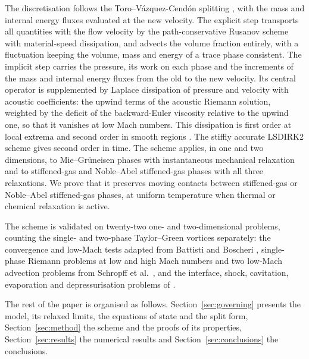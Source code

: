 The discretisation follows the Toro--V\'azquez-Cend\'on splitting \cite{ToroVazquez2012}, with the mass and internal energy
fluxes evaluated at the new velocity. The explicit step transports all quantities with the flow velocity by the path-conservative Rusanov scheme \cite{Pares2006,Castro2006} with material-speed
dissipation, and advects the volume fraction entirely, with a fluctuation keeping the volume, mass and energy of a trace
phase consistent. The implicit step carries the pressure, its work on each phase and the increments of the mass and
internal energy fluxes from the old to the new velocity. Its central operator is supplemented by Laplace dissipation of pressure and
velocity with acoustic coefficients: the upwind terms of the acoustic Riemann solution, weighted by the deficit of the
backward-Euler viscosity relative to the upwind one, so that it vanishes at low Mach numbers. This dissipation is first
order at local extrema and second order in smooth regions \cite{Jameson1995}. The stiffly accurate LSDIRK2 scheme
\cite{BoscarinoFilbetRusso2016} gives second order in time. The scheme applies, in one and two dimensions, to
Mie--Gr\"uneisen phases with instantaneous mechanical relaxation and to stiffened-gas and Noble--Abel stiffened-gas
phases with all three relaxations. We prove that it preserves moving contacts between stiffened-gas or Noble--Abel
stiff\-ened-gas phases, at uniform temperature when thermal or chemical relaxation is active.

The scheme is validated on twenty-two one- and two-dimensional problems, counting the single- and two-phase
Taylor--Green vortices separately: the convergence and low-Mach tests adapted from Battisti and Boscheri
\cite{BattistiBoscheri2025}, single-phase Riemann problems at low and high Mach numbers and two low-Mach advection
problems from Schropff et al.\ \cite{Schropff2026}, and the interface, shock, cavitation, evaporation and
depressurisation problems of \cite{SPB2009,PelantiShyue2014,Pelanti2022}.

The rest of the paper is organised as follows. Section~\ref{sec:governing} presents the model, its relaxed limits, the
equations of state and the split form, Section~\ref{sec:method} the scheme and the proofs of its properties,
Section~\ref{sec:results} the numerical results and Section~\ref{sec:conclusions} the conclusions.
